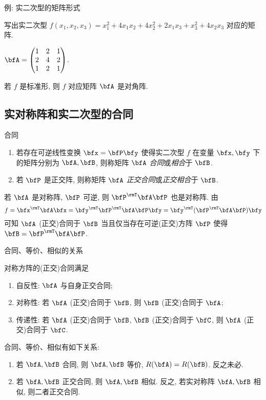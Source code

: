 \begin{frame}{例: 实二次型的矩阵形式}
	\onslide<+->
	\begin{example}
		写出实二次型 $f(x_1,x_2,x_3)=x_1^2+4x_1x_2+4x_2^2+2x_1x_3+x_3^2+4x_2x_3$ 对应的矩阵.
	\end{example}
	\onslide<+->
	\begin{solution}
		$\bfA=\begin{pmatrix}
			1&2&1\\
			2&4&2\\
			1&2&1
		\end{pmatrix}$.
	\end{solution}
	\onslide<+->
	若 $f$ 是标准形, 则 $f$ 对应矩阵 $\bfA$ 是对角阵.
\end{frame}



\subsection{实对称阵和实二次型的合同}
\begin{frame}{合同}
	\onslide<+->
	\begin{definition}
		\begin{enumerate}
			\item 若存在可逆线性变换 $\bfx=\bfP\bfy$ 使得实二次型 $f$ 在变量 $\bfx,\bfy$ 下的矩阵分别为 $\bfA,\bfB$, 则称矩阵 $\bfA$ \emph{合同}或\emph{相合}于 $\bfB$.
			\item 若 $\bfP$ 是正交阵, 则称矩阵 $\bfA$ \emph{正交合同}或\emph{正交相合}于 $\bfB$.
		\end{enumerate}
	\end{definition}
	\onslide<+->
	若 $\bfA$ 是对称阵, $\bfP$ 可逆, 则 $\bfP^\rmT\bfA\bfP$ 也是对称阵.
	\onslide<+->
	由
	\[f=\bfx^\rmT\bfA\bfx=\bfy^\rmT\bfP^\rmT\bfA\bfP\bfy
	=\bfy^\rmT(\bfP^\rmT\bfA\bfP)\bfy\]
	可知 $\bfA$ (正交)合同于 $\bfB$ 当且仅当存在可逆(正交)方阵 $\bfP$ 使得 $\bfB=\bfP^\rmT\bfA\bfP$.
\end{frame}


\begin{frame}{合同、等价、相似的关系}
	\onslide<+->
	\begin{proposition}
		对称方阵的(正交)合同满足
		\begin{enumerate}
			\item 自反性: $\bfA$ 与自身正交合同;
			\item 对称性: 若 $\bfA$ (正交)合同于 $\bfB$, 则 $\bfB$ (正交)合同于 $\bfA$;
			\item 传递性: 若 $\bfA$ (正交)合同于 $\bfB$, $\bfB$ (正交)合同于 $\bfC$, 则 $\bfA$ (正交)合同于 $\bfC$.
		\end{enumerate}
	\end{proposition}

	\onslide<+->
	合同、等价、相似有如下关系:
	\begin{enumerate}
		\item 若 $\bfA,\bfB$ 合同, 则 $\bfA,\bfB$ 等价, $R(\bfA)=R(\bfB)$. 反之未必.
		\item 若 $\bfA,\bfB$ 正交合同, 则 $\bfA,\bfB$ 相似. 反之, \alert{若实对称阵 $\bfA,\bfB$ 相似, 则二者正交合同}.
	\end{enumerate}
\end{frame}


